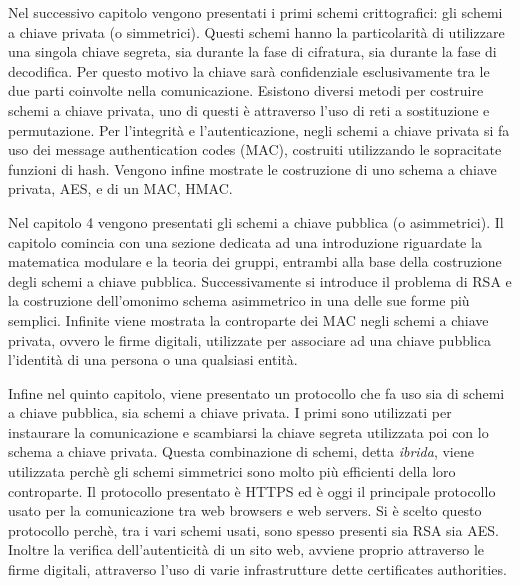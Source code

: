 \par
Nel successivo capitolo vengono presentati i primi schemi crittografici: gli schemi a chiave privata (o simmetrici). Questi schemi hanno la particolarità di utilizzare una singola chiave segreta, sia durante la fase di cifratura, sia durante la fase di decodifica. Per questo motivo la chiave sarà confidenziale esclusivamente tra le due parti coinvolte nella comunicazione. Esistono diversi metodi per costruire schemi a chiave privata, uno di questi è attraverso l'uso di reti a sostituzione e permutazione. Per l'integrità e l'autenticazione, negli schemi a chiave privata si fa uso dei message authentication codes (MAC), costruiti utilizzando le sopracitate funzioni di hash. Vengono infine mostrate le costruzione di uno schema a chiave privata, AES, e di un MAC, HMAC.
\par
Nel capitolo 4 vengono presentati gli schemi a chiave pubblica (o asimmetrici). Il capitolo comincia con una sezione dedicata ad una introduzione riguardate la matematica modulare e la teoria dei gruppi, entrambi alla base della costruzione degli schemi a chiave pubblica. Successivamente si introduce il problema di RSA e la costruzione dell'omonimo schema asimmetrico in una delle sue forme più semplici. Infinite viene mostrata la controparte dei MAC negli schemi a chiave privata, ovvero le firme digitali, utilizzate per associare ad una chiave pubblica l'identità di una persona o una qualsiasi entità.
\par
Infine nel quinto capitolo, viene presentato un protocollo che fa uso sia di schemi a chiave pubblica, sia schemi a chiave privata. I primi sono utilizzati per instaurare la comunicazione e scambiarsi la chiave segreta utilizzata poi con lo schema a chiave privata. Questa combinazione di schemi, detta \emph{ibrida}, viene utilizzata perchè gli schemi simmetrici sono molto più efficienti della loro controparte. Il protocollo presentato è HTTPS ed è oggi il principale protocollo usato per la comunicazione tra web browsers e web servers. Si è scelto questo protocollo perchè, tra i vari schemi usati, sono spesso presenti sia RSA sia AES. Inoltre la verifica dell'autenticità di un sito web, avviene proprio attraverso le firme digitali, attraverso l'uso di varie infrastrutture dette certificates authorities.
